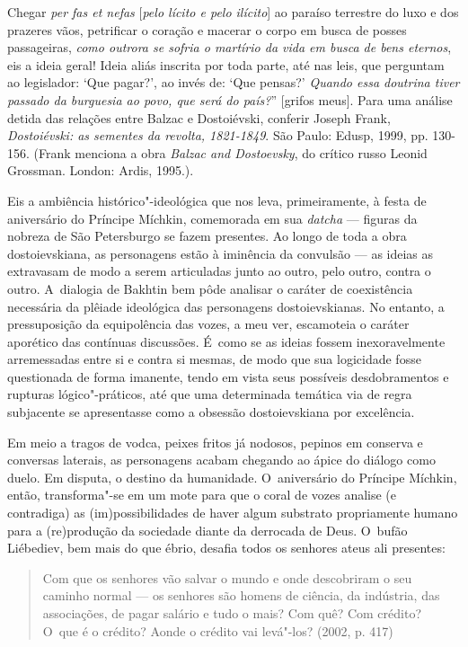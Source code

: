 {  Chegar \emph{per fas et nefas} {[}\emph{pelo lícito e pelo ilícito}{]}
  ao paraíso terrestre do luxo e dos prazeres vãos, petrificar o coração
  e macerar o corpo em busca de posses passageiras, \emph{como outrora
  se sofria o martírio da vida em busca de bens eternos}, eis a ideia
  geral! Ideia aliás inscrita por toda parte, até nas leis, que
  perguntam ao legislador: `Que pagar?', ao invés de: `Que pensas?'
  \emph{Quando essa doutrina tiver passado da burguesia ao povo, que
  será do país?}'' {[}grifos meus{]}. Para uma análise detida das
  relações entre Balzac e Dostoiévski, conferir Joseph Frank,
  \emph{Dostoiévski: as sementes da revolta, 1821-1849}. São Paulo:
  Edusp, 1999, pp. 130-156. (Frank menciona a obra \emph{Balzac and
  Dostoevsky}, do crítico russo Leonid Grossman. London: Ardis, 1995.)}.

Eis a ambiência histórico"-ideológica que nos leva, primeiramente, à
festa de aniversário do Príncipe Míchkin, comemorada em sua
\emph{datcha} --- figuras da nobreza de São Petersburgo se fazem
presentes. Ao longo de toda a obra dostoievskiana, as personagens estão
à iminência da convulsão --- as ideias as extravasam de modo a serem
articuladas junto ao outro, pelo outro, contra o outro. A~dialogia de
Bakhtin bem pôde analisar o caráter de coexistência necessária da
plêiade ideológica das personagens dostoievskianas. No entanto, a
pressuposição da equipolência das vozes, a meu ver, escamoteia o caráter
aporético das contínuas discussões. É~como se as ideias fossem
inexoravelmente arremessadas entre si e contra si mesmas, de modo que
sua logicidade fosse questionada de forma imanente, tendo em vista seus
possíveis desdobramentos e rupturas lógico"-práticos, até que uma
determinada temática via de regra subjacente se apresentasse como a
obsessão dostoievskiana por excelência.

Em meio a tragos de vodca, peixes fritos já nodosos, pepinos em conserva
e conversas laterais, as personagens acabam chegando ao ápice do diálogo
como duelo. Em disputa, o destino da humanidade. O~aniversário do
Príncipe Míchkin, então, transforma"-se em um mote para que o coral de
vozes analise (e contradiga) as (im)possibilidades de haver algum
substrato propriamente humano para a (re)produção da sociedade diante da
derrocada de Deus. O~bufão Liébediev, bem mais do que ébrio, desafia
todos os senhores ateus ali presentes:

\begin{quote}
Com que os senhores vão salvar o mundo e onde descobriram o seu caminho
normal --- os senhores são homens de ciência, da indústria, das
associações, de pagar salário e tudo o mais? Com quê? Com crédito? O~que
é o crédito? Aonde o crédito vai levá"-los? (2002, p. 417)
\end{quote}

